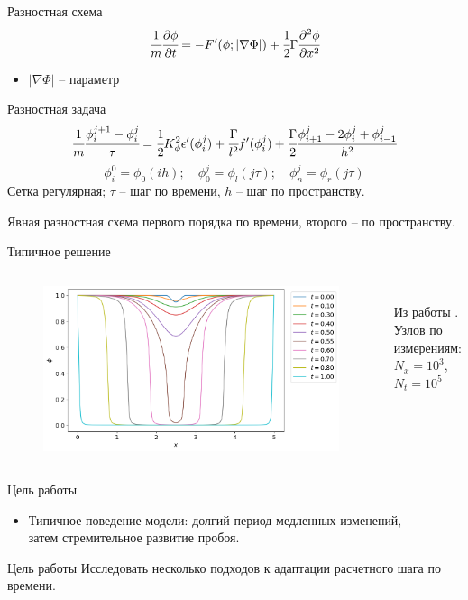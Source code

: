 \begin{frame}{Разностная схема}
\vspace{-0.9cm}
\[
	\cfrac{1}{m} \cfrac{\partial \phi}{\partial t} = -F'(\phi; |\nabla \Phi|) + \cfrac{1}{2} \Gamma \cfrac{\partial^2 \phi}{\partial x^2}
\]
\vspace{-0.4cm}
\begin{itemize}
	\item $|\nabla \Phi|$ -- параметр
\end{itemize}
\begin{block}{Разностная задача}
	\[
		\cfrac{1}{m} \cfrac{\phi_i^{j + 1} - \phi_i^j}{\tau} = \cfrac{1}{2} K_\phi^2 \epsilon'(\phi_i^j) + \cfrac{\Gamma}{l^2} f'(\phi_i^j) + \cfrac{\Gamma}{2} \cfrac{\phi_{i + 1}^j - 2 \phi_i^j + \phi_{i - 1}^j}{h^2}
	\]
	\[\phi_i^0 = \phi_0(ih); \quad \phi_0^j = \phi_l(j \tau); \quad \phi_n^j = \phi_r(j \tau)\]
	Сетка регулярная; $\tau$ -- шаг по времени, $h$ -- шаг по пространству.
\end{block}
Явная разностная схема первого порядка по времени, второго -- по пространству.
\end{frame}


\begin{frame}{Типичное решение}
\vspace{-0.4cm}
\begin{columns}
\begin{figure}
	\includegraphics[width=\textwidth]{figures/typical_solution.png}
\end{figure}
\hfill \\
\vspace{3.5cm}
\hspace{-2.5cm}
Из работы \cite{ponomarev_stability}. \\
\hspace{-2.5cm}
Узлов по измерениям: \\
\hspace{-2.5cm}
$N_x = 10^3$, $N_t = 10^5$
\end{columns}
\end{frame}


\begin{frame}{Цель работы}
\begin{itemize}
	\item Типичное поведение модели: долгий период медленных изменений, \\ затем стремительное развитие пробоя.
\end{itemize}
\begin{block}{Цель работы}
	Исследовать несколько подходов к адаптации расчетного шага по времени.
\end{block}
\end{frame}